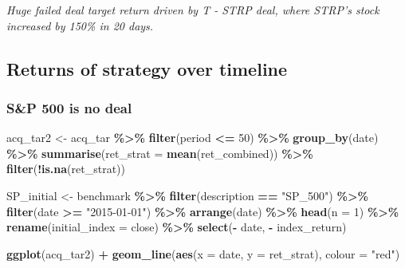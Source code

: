 \documentclass[
]{article}
\newenvironment{Shaded}{\begin{snugshade}}{\end{snugshade}}
\newcommand{\DataTypeTok}[1]{\textcolor[rgb]{0.13,0.29,0.53}{#1}}
\newcommand{\DecValTok}[1]{\textcolor[rgb]{0.00,0.00,0.81}{#1}}
\newcommand{\KeywordTok}[1]{\textcolor[rgb]{0.13,0.29,0.53}{\textbf{#1}}}
\newcommand{\NormalTok}[1]{#1}
\newcommand{\OperatorTok}[1]{\textcolor[rgb]{0.81,0.36,0.00}{\textbf{#1}}}
\newcommand{\StringTok}[1]{\textcolor[rgb]{0.31,0.60,0.02}{#1}}
\begin{document}
\emph{Huge failed deal target return driven by T - STRP deal, where
STRP's stock increased by 150\% in 20 days.}

\hypertarget{returns-of-strategy-over-timeline}{%
\subsection{Returns of strategy over
timeline}\label{returns-of-strategy-over-timeline}}

\hypertarget{sp-500-is-no-deal}{%
\subsubsection{S\&P 500 is no deal}\label{sp-500-is-no-deal}}

\begin{Shaded}
\begin{Highlighting}[]
\NormalTok{acq\_tar2 \textless{}{-}}\StringTok{ }\NormalTok{acq\_tar }\OperatorTok{\%\textgreater{}\%}
\StringTok{  }\KeywordTok{filter}\NormalTok{(period }\OperatorTok{\textless{}=}\StringTok{ }\DecValTok{50}\NormalTok{) }\OperatorTok{\%\textgreater{}\%}\StringTok{ }
\StringTok{  }\KeywordTok{group\_by}\NormalTok{(date) }\OperatorTok{\%\textgreater{}\%}
\StringTok{  }\KeywordTok{summarise}\NormalTok{(}\DataTypeTok{ret\_strat =} \KeywordTok{mean}\NormalTok{(ret\_combined)) }\OperatorTok{\%\textgreater{}\%}\StringTok{ }
\StringTok{  }\KeywordTok{filter}\NormalTok{(}\OperatorTok{!}\KeywordTok{is.na}\NormalTok{(ret\_strat))}




\NormalTok{SP\_initial \textless{}{-}}\StringTok{ }\NormalTok{benchmark }\OperatorTok{\%\textgreater{}\%}
\StringTok{  }\KeywordTok{filter}\NormalTok{(description }\OperatorTok{==}\StringTok{ "SP\_500"}\NormalTok{) }\OperatorTok{\%\textgreater{}\%}
\StringTok{  }\KeywordTok{filter}\NormalTok{(date }\OperatorTok{\textgreater{}=}\StringTok{ "2015{-}01{-}01"}\NormalTok{) }\OperatorTok{\%\textgreater{}\%}
\StringTok{  }\KeywordTok{arrange}\NormalTok{(date) }\OperatorTok{\%\textgreater{}\%}
\StringTok{  }\KeywordTok{head}\NormalTok{(}\DataTypeTok{n =} \DecValTok{1}\NormalTok{) }\OperatorTok{\%\textgreater{}\%}
\StringTok{  }\KeywordTok{rename}\NormalTok{(}\DataTypeTok{initial\_index =}\NormalTok{ close) }\OperatorTok{\%\textgreater{}\%}
\StringTok{  }\KeywordTok{select}\NormalTok{(}\OperatorTok{{-}}\StringTok{ }\NormalTok{date, }\OperatorTok{{-}}\StringTok{ }\NormalTok{index\_return)}

  \KeywordTok{ggplot}\NormalTok{(acq\_tar2) }\OperatorTok{+}
\StringTok{  }\KeywordTok{geom\_line}\NormalTok{(}\KeywordTok{aes}\NormalTok{(}\DataTypeTok{x =}\NormalTok{ date, }\DataTypeTok{y =}\NormalTok{ ret\_strat), }\DataTypeTok{colour =} \StringTok{"red"}\NormalTok{) }
\end{Highlighting}
\end{Shaded}
\end{document}
